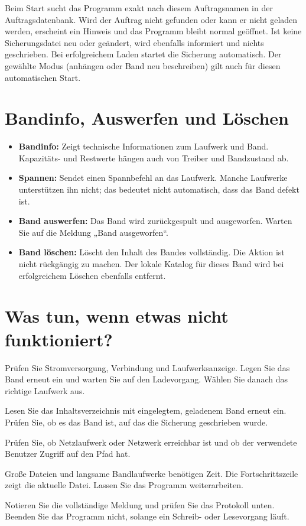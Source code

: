 \documentclass[11pt,a4paper]{article}
\begin{document}
Beim Start sucht das Programm exakt nach diesem Auftragsnamen in der Auftragsdatenbank. Wird der Auftrag nicht gefunden oder kann er nicht geladen werden, erscheint ein Hinweis und das Programm bleibt normal geöffnet. Ist keine Sicherungsdatei neu oder geändert, wird ebenfalls informiert und nichts geschrieben. Bei erfolgreichem Laden startet die Sicherung automatisch. Der gewählte Modus (anhängen oder Band neu beschreiben) gilt auch für diesen automatischen Start.

\section{Bandinfo, Auswerfen und Löschen}
\begin{itemize}
\item \textbf{Bandinfo:} Zeigt technische Informationen zum Laufwerk und Band. Kapazitäts- und Restwerte hängen auch von Treiber und Bandzustand ab.
\item \textbf{Spannen:} Sendet einen Spannbefehl an das Laufwerk. Manche Laufwerke unterstützen ihn nicht; das bedeutet nicht automatisch, dass das Band defekt ist.
\item \textbf{Band auswerfen:} Das Band wird zurückgespult und ausgeworfen. Warten Sie auf die Meldung „Band ausgeworfen“.
\item \textbf{Band löschen:} Löscht den Inhalt des Bandes vollständig. Die Aktion ist nicht rückgängig zu machen. Der lokale Katalog für dieses Band wird bei erfolgreichem Löschen ebenfalls entfernt.
\end{itemize}

\section{Was tun, wenn etwas nicht funktioniert?}
\begin{description}[style=nextline]
\item[Das Band wird nicht erkannt] Prüfen Sie Stromversorgung, Verbindung und Laufwerksanzeige. Legen Sie das Band erneut ein und warten Sie auf den Ladevorgang. Wählen Sie danach das richtige Laufwerk aus.
\item[Der Katalog ist leer] Lesen Sie das Inhaltsverzeichnis mit eingelegtem, geladenem Band erneut ein. Prüfen Sie, ob es das Band ist, auf das die Sicherung geschrieben wurde.
\item[Eine Quelle fehlt] Prüfen Sie, ob Netzlaufwerk oder Netzwerk erreichbar ist und ob der verwendete Benutzer Zugriff auf den Pfad hat.
\item[Die Sicherung dauert lange] Große Dateien und langsame Bandlaufwerke benötigen Zeit. Die Fortschrittszeile zeigt die aktuelle Datei. Lassen Sie das Programm weiterarbeiten.
\item[Es erscheint ein Fehler] Notieren Sie die vollständige Meldung und prüfen Sie das Protokoll unten. Beenden Sie das Programm nicht, solange ein Schreib- oder Lesevorgang läuft.
\end{description}
\end{document}
